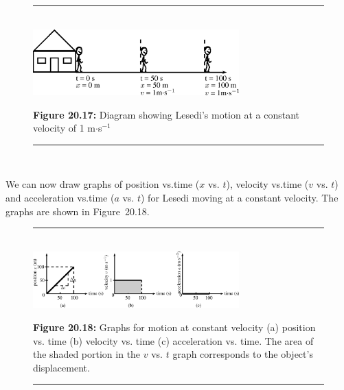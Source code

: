 	\begin{figure}[H] %
    \begin{center}
    \rule[.1in]{\figurerulewidth}{.005in} \\
        \label{m38795*uid91!!!underscore!!!media}\label{m38795*uid91!!!underscore!!!printimage}\includegraphics[width=300px]{col11305.imgs/m38795_PG10C2_022.png} %
      \vspace{2pt}
    \vspace{\rubberspace}\par \begin{cnxcaption}
	  \small \textbf{Figure 20.17: }Diagram showing Lesedi's motion at a constant velocity of 1 m$\ensuremath{\cdot}$s${}^{-1}$
	\end{cnxcaption}
    \vspace{.1in}
    \rule[.1in]{\figurerulewidth}{.005in} \\
    \end{center}
 \end{figure}       
        \label{m38795*id70106}We can now draw graphs of position vs.time ($x$ vs. $t$), velocity vs.time ($v$ vs. $t$) and acceleration vs.time ($a$ vs. $t$) for Lesedi moving at a constant velocity. The graphs are shown in Figure~20.18.\par 
    \setcounter{subfigure}{0}
	\begin{figure}[H] %
    \begin{center}
    \rule[.1in]{\figurerulewidth}{.005in} \\
        \label{m38795*uid92!!!underscore!!!media}\label{m38795*uid92!!!underscore!!!printimage}\includegraphics[width=300px]{col11305.imgs/m38795_PG10C2_023.png} %
      \vspace{2pt}
    \vspace{\rubberspace}\par \begin{cnxcaption}
	  \small \textbf{Figure 20.18: }Graphs for motion at constant velocity (a) position vs. time (b) velocity vs. time (c) acceleration vs. time. The area of the shaded portion in the $v$ vs. $t$ graph corresponds to the object's displacement.
	\end{cnxcaption}
    \vspace{.1in}
    \rule[.1in]{\figurerulewidth}{.005in} \\
    \end{center}
 \end{figure}       

